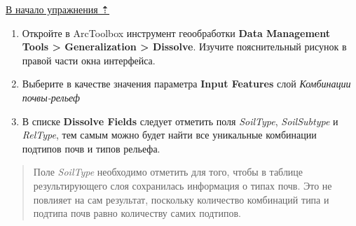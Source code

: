 \documentclass[12pt,]{book}
\begin{document}
\protect\hyperlink{overlay}{В начало упражнения ⇡}

\begin{enumerate}
\def\labelenumi{\arabic{enumi}.}
\item
  Откройте в ArcToolbox инструмент геообработки \textbf{Data Management Tools \textgreater{} Generalization \textgreater{} Dissolve}. Изучите пояснительный рисунок в правой части окна интерфейса.
\item
  Выберите в качестве значения параметра \textbf{Input Features} слой \emph{Комбинации почвы-рельеф}
\item
  В списке \textbf{Dissolve Fields} следует отметить поля \emph{SoilType}, \emph{SoilSubtype} и \emph{RelType}, тем самым можно будет найти все уникальные комбинации подтипов почв и типов рельефа.
\end{enumerate}

\begin{quote}
Поле \emph{SoilType} необходимо отметить для того, чтобы в таблице результирующего слоя сохранилась информация о типах почв. Это не повлияет на сам результат, поскольку количество комбинаций типа и подтипа почв равно количеству самих подтипов.
\end{quote}
\end{document}
